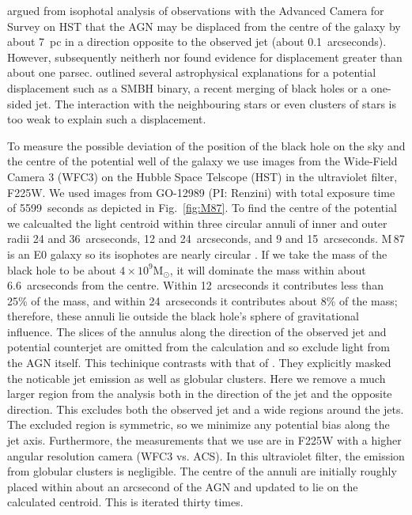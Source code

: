 \documentclass[useAMS,usenatbib]{mn2e}
\newcommand{\msun}{\mathrm{M}_\odot}
\begin{document}
\citet{2010ApJ...717L...6B} argued from isophotal analysis of
observations with the Advanced Camera for Survey on HST that the AGN
may be displaced from the centre of the galaxy by about 7~pc in a
direction opposite to the observed jet (about 0.1~arcseconds).
However, subsequently neitherh \citet{2011ApJ...729..119G} nor
\citet{2013ApJ...770...86W} found evidence for displacement greater
than about one parsec.  \citet{2010ApJ...717L...6B} outlined several
astrophysical explanations for a potential displacement such as a SMBH
binary, a recent merging of black holes or a one-sided jet.  The
interaction with the neighbouring stars or even clusters of stars is
too weak to explain such a displacement.

To measure the possible deviation of the position of the black hole on
the sky and the centre of the potential well of the galaxy we use
images from the Wide-Field Camera 3 (WFC3) on the Hubble Space
Telscope (HST) in the ultraviolet filter, F225W.  We used images from
GO-12989 (PI: Renzini) with total exposure time of 5599~seconds as
depicted in Fig.~\ref{fig:M87}.  To find the centre of the potential
we calcualted the light centroid within three circular annuli of inner
and outer radii 24 and 36~arcseconds, 12 and 24~arcseconds, and 9 and
15~arcseconds.  M\,87 is an E0 galaxy so its isophotes are nearly
circular \citep{2006ApJS..164..334F}.  If we take the mass of the
black hole to be about $4\times 10^9\msun$, it will dominate the mass
within about 6.6~arcseconds from the centre.  Within 12~arcseconds it
contributes less than 25\% of the mass, and within 24~arcseconds it
contributes about 8\% of the mass; therefore, these annuli lie outside
the black hole's sphere of gravitational influence.  The slices of the
annulus along the direction of the observed jet and potential
counterjet are omitted from the calculation and so exclude light from
the AGN itself.  This techinique contrasts with that of
\citet{2010ApJ...717L...6B}.  They explicitly masked the noticable jet
emission as well as globular clusters.  Here we remove a much larger
region from the analysis both in the direction of the jet and the
opposite direction.  This excludes both the observed jet and a wide
regions around the jets.  The excluded region is symmetric, so we
minimize any potential bias along the jet axis.  Furthermore, the
measurements that we use are in F225W with a higher angular resolution
camera (WFC3 vs. ACS).  In this ultraviolet filter, the emission from
globular clusters is negligible.  The centre of the annuli are
initially roughly placed within about an arcsecond of the AGN and
updated to lie on the calculated centroid. This is iterated thirty
times.
\end{document}
